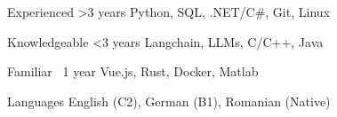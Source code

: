 

\begin{cvskills}

  \cvskill
    {Experienced \quad\textbar\quad >3 years} %
    {Python, SQL, .NET/C\#, Git, Linux} %

  \cvskill
    {Knowledgeable \quad\textbar\quad <3 years} %
    {Langchain, LLMs, C/C++, Java} %

  \cvskill
    {Familiar \quad\textbar\quad ~1 year} %
    {Vue.js, Rust, Docker, Matlab} %

  \cvskill
    {Languages} %
    {English (C2), German (B1), Romanian (Native)} 

\end{cvskills}
